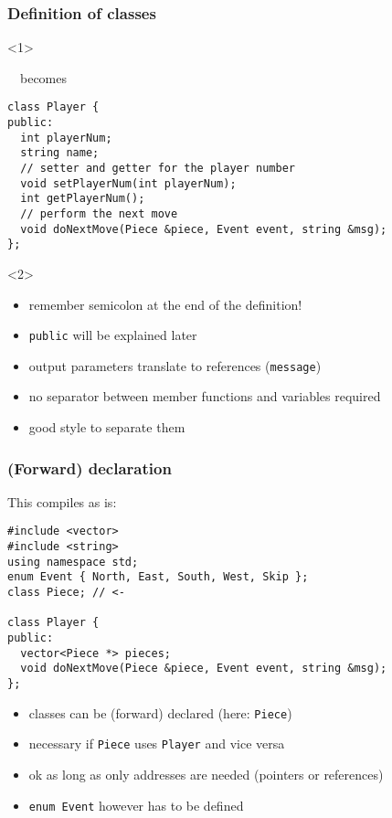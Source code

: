 \documentclass{slides}
\begin{document}
\begin{frame}[fragile]
  \frametitle{Definition of classes}

  \begin{onlyenv}<1> 
    ~~becomes
    \medskip
\end{onlyenv}

\begin{lstlisting}[emph={class,public}]
class Player {
public:
  int playerNum;
  string name;
  // setter and getter for the player number
  void setPlayerNum(int playerNum);
  int getPlayerNum();
  // perform the next move
  void doNextMove(Piece &piece, Event event, string &msg);
};
\end{lstlisting}

\begin{onlyenv}<2>
  \begin{itemize}
  \item \alert{remember semicolon at the end of the definition!}
  \item \lstinline!public! will be explained later
  \item output parameters translate to references (\lstinline!message!)
  \item no separator between member functions and variables required
  \item good style to separate them
  \end{itemize}
\end{onlyenv}
\end{frame}

\begin{frame}[fragile]
  \frametitle{(Forward) declaration}

This compiles as is:
\begin{lstlisting}
#include <vector>
#include <string>
using namespace std;
enum Event { North, East, South, West, Skip };
class Piece; // <-

class Player {
public:
  vector<Piece *> pieces;
  void doNextMove(Piece &piece, Event event, string &msg);
};
\end{lstlisting}

  \begin{itemize}
  \item classes can be (forward) \alert{declared} (here: \lstinline!Piece!)
  \item necessary if \lstinline!Piece! uses \lstinline!Player!
    and vice versa
  \item ok as long as only addresses are needed (pointers or references)
  \item \lstinline!enum Event! however has to be defined
  \end{itemize}
  
\end{frame}
\end{document}

